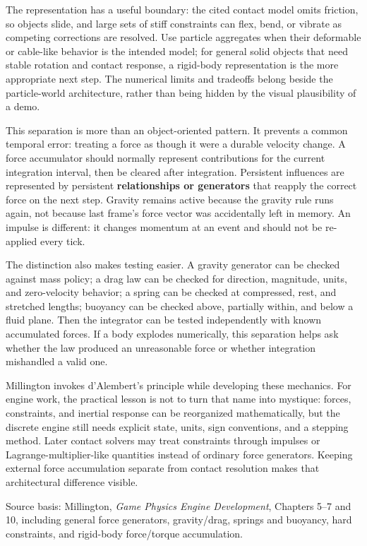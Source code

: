 The representation has a useful boundary: the cited contact model omits friction, so objects slide, and large sets of stiff constraints can flex, bend, or vibrate as competing corrections are resolved. Use particle aggregates when their deformable or cable-like behavior is the intended model; for general solid objects that need stable rotation and contact response, a rigid-body representation is the more appropriate next step. The numerical limits and tradeoffs belong beside the particle-world architecture, rather than being hidden by the visual plausibility of a demo.

This separation is more than an object-oriented pattern. It prevents a common temporal error: treating a force as though it were a durable velocity change. A force accumulator should normally represent contributions for the current integration interval, then be cleared after integration. Persistent influences are represented by persistent \textbf{relationships or generators} that reapply the correct force on the next step. Gravity remains active because the gravity rule runs again, not because last frame's force vector was accidentally left in memory. An impulse is different: it changes momentum at an event and should not be re-applied every tick.

The distinction also makes testing easier. A gravity generator can be checked against mass policy; a drag law can be checked for direction, magnitude, units, and zero-velocity behavior; a spring can be checked at compressed, rest, and stretched lengths; buoyancy can be checked above, partially within, and below a fluid plane. Then the integrator can be tested independently with known accumulated forces. If a body explodes numerically, this separation helps ask whether the law produced an unreasonable force or whether integration mishandled a valid one.

Millington invokes d'Alembert's principle while developing these mechanics. For engine work, the practical lesson is not to turn that name into mystique: forces, constraints, and inertial response can be reorganized mathematically, but the discrete engine still needs explicit state, units, sign conventions, and a stepping method. Later contact solvers may treat constraints through impulses or Lagrange-multiplier-like quantities instead of ordinary force generators. Keeping external force accumulation separate from contact resolution makes that architectural difference visible.

Source basis: Millington, \emph{Game Physics Engine Development}, Chapters 5--7 and 10, including general force generators, gravity/drag, springs and buoyancy, hard constraints, and rigid-body force/torque accumulation.


